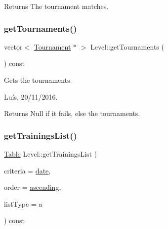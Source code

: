 \begin{DoxyReturn}{Returns}
The tournament matches. 
\end{DoxyReturn}
\hypertarget{class_level_ad01baca6bdb906c6d605f04f6885cb81}{}\label{class_level_ad01baca6bdb906c6d605f04f6885cb81} 
\subsubsection{\texorpdfstring{get\+Tournaments()}{getTournaments()}}
{\footnotesize\ttfamily vector$<$ \hyperlink{class_tournament}{Tournament} $\ast$ $>$ Level\+::get\+Tournaments (\begin{DoxyParamCaption}{ }\end{DoxyParamCaption}) const}



Gets the tournaments. 

Luís, 20/11/2016. 

\begin{DoxyReturn}{Returns}
Null if it fails, else the tournaments. 
\end{DoxyReturn}
\hypertarget{class_level_a49d9f8bc2848dc41199342b1a0557631}{}\label{class_level_a49d9f8bc2848dc41199342b1a0557631} 
\subsubsection{\texorpdfstring{get\+Trainings\+List()}{getTrainingsList()}}
{\footnotesize\ttfamily \hyperlink{class_table}{Table} Level\+::get\+Trainings\+List (\begin{DoxyParamCaption}\item[{\hyperlink{_training_8hpp_aa44c715f606358e721f7911b15a1cfc5}{Sort\+Criteria}}]{criteria = {\ttfamily \hyperlink{_training_8hpp_aa44c715f606358e721f7911b15a1cfc5aa325b226dd9bbe4b1d3989a96326bb43}{date}},  }\item[{\hyperlink{_training_8hpp_ad9be72f666a31b4318bbc8e8a16a9472}{Sort\+Order}}]{order = {\ttfamily \hyperlink{_training_8hpp_ad9be72f666a31b4318bbc8e8a16a9472a9c04aeb1f974b5141257e307bcd1610d}{ascending}},  }\item[{char}]{list\+Type = {\ttfamily \textquotesingle{}a\textquotesingle{}} }\end{DoxyParamCaption}) const}



